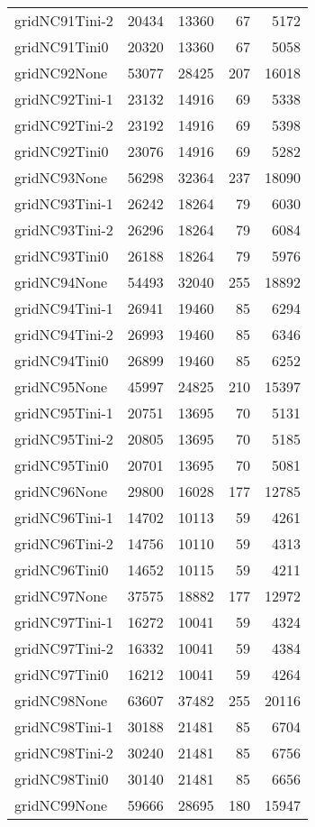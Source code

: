 \begin{longtable}{lrrrr}
gridNC91Tini-2 & 20434 & 13360 & 67 & 5172 \\
gridNC91Tini0 & 20320 & 13360 & 67 & 5058 \\
gridNC92None & 53077 & 28425 & 207 & 16018 \\
gridNC92Tini-1 & 23132 & 14916 & 69 & 5338 \\
gridNC92Tini-2 & 23192 & 14916 & 69 & 5398 \\
gridNC92Tini0 & 23076 & 14916 & 69 & 5282 \\
gridNC93None & 56298 & 32364 & 237 & 18090 \\
gridNC93Tini-1 & 26242 & 18264 & 79 & 6030 \\
gridNC93Tini-2 & 26296 & 18264 & 79 & 6084 \\
gridNC93Tini0 & 26188 & 18264 & 79 & 5976 \\
gridNC94None & 54493 & 32040 & 255 & 18892 \\
gridNC94Tini-1 & 26941 & 19460 & 85 & 6294 \\
gridNC94Tini-2 & 26993 & 19460 & 85 & 6346 \\
gridNC94Tini0 & 26899 & 19460 & 85 & 6252 \\
gridNC95None & 45997 & 24825 & 210 & 15397 \\
gridNC95Tini-1 & 20751 & 13695 & 70 & 5131 \\
gridNC95Tini-2 & 20805 & 13695 & 70 & 5185 \\
gridNC95Tini0 & 20701 & 13695 & 70 & 5081 \\
gridNC96None & 29800 & 16028 & 177 & 12785 \\
gridNC96Tini-1 & 14702 & 10113 & 59 & 4261 \\
gridNC96Tini-2 & 14756 & 10110 & 59 & 4313 \\
gridNC96Tini0 & 14652 & 10115 & 59 & 4211 \\
gridNC97None & 37575 & 18882 & 177 & 12972 \\
gridNC97Tini-1 & 16272 & 10041 & 59 & 4324 \\
gridNC97Tini-2 & 16332 & 10041 & 59 & 4384 \\
gridNC97Tini0 & 16212 & 10041 & 59 & 4264 \\
gridNC98None & 63607 & 37482 & 255 & 20116 \\
gridNC98Tini-1 & 30188 & 21481 & 85 & 6704 \\
gridNC98Tini-2 & 30240 & 21481 & 85 & 6756 \\
gridNC98Tini0 & 30140 & 21481 & 85 & 6656 \\
gridNC99None & 59666 & 28695 & 180 & 15947 \\

\end{longtable}
